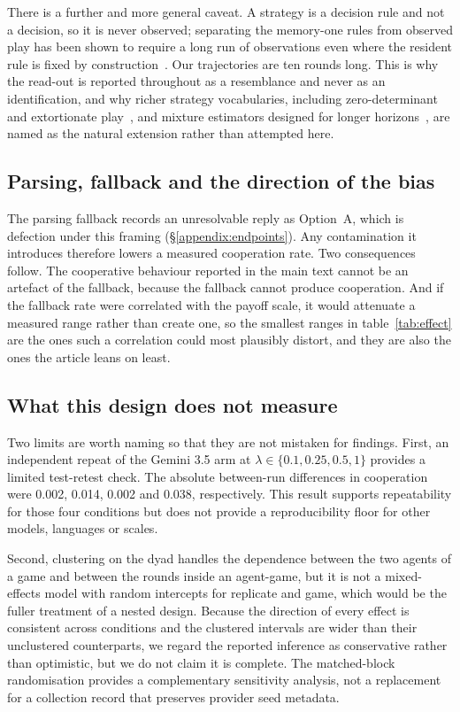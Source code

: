 \documentclass[11pt,a4paper]{article}
\newcommand{\lam}{\lambda}
\begin{document}
There is a further and more general caveat. A strategy is a decision rule and
not a decision, so it is never observed; separating the memory-one rules from
observed play has been shown to require a long run of observations even where
the resident rule is fixed by construction~\cite{kim2021win,hilbe2013memory}.
Our trajectories are ten rounds long. This is why the read-out is reported
throughout as a resemblance and never as an identification, and why richer
strategy vocabularies, including zero-determinant and extortionate
play~\cite{pressDyson2012}, and mixture estimators designed for longer
horizons~\cite{fontana2025nicer,inferenceStrategies}, are named as the natural
extension rather than attempted here.

\subsection{Parsing, fallback and the direction of the bias}\label{appendix:robust_parsing}

The parsing fallback records an unresolvable reply as Option~A, which is
defection under this framing (\S\ref{appendix:endpoints}). Any contamination it
introduces therefore lowers a measured cooperation rate. Two consequences
follow. The cooperative behaviour reported in the main text cannot be an
artefact of the fallback, because the fallback cannot produce cooperation. And
if the fallback rate were correlated with the payoff scale, it would attenuate
a measured range rather than create one, so the smallest ranges in
table~\ref{tab:effect} are the ones such a correlation could most plausibly
distort, and they are also the ones the article leans on least.

\subsection{What this design does not measure}\label{appendix:robust_gaps}

Two limits are worth naming so that they are not mistaken for findings.
First, an independent repeat of the Gemini 3.5 arm at $\lam \in
\{0.1,0.25,0.5,1\}$ provides a limited test-retest check. The absolute
between-run differences in cooperation were 0.002, 0.014, 0.002 and 0.038,
respectively. This result supports repeatability for those four conditions but
does not provide a reproducibility floor for other models, languages or scales.

Second, clustering on the dyad handles the dependence between the two agents of
a game and between the rounds inside an agent-game, but it is not a
mixed-effects model with random intercepts for replicate and game, which would
be the fuller treatment of a nested design. Because the direction of every
effect is consistent across conditions and the clustered intervals are wider
than their unclustered counterparts, we regard the reported inference as
conservative rather than optimistic, but we do not claim it is complete.
The matched-block randomisation provides a complementary sensitivity analysis,
not a replacement for a collection record that preserves provider seed metadata.
\end{document}
